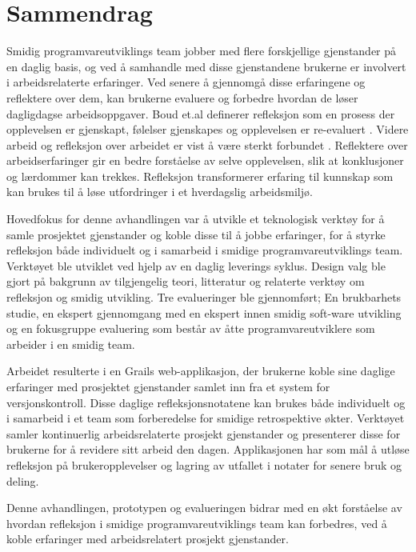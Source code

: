 \newpage
\section*{Sammendrag}
Smidig programvareutviklings team jobber med flere forskjellige gjenstander på en daglig basis, og ved å samhandle med disse gjenstandene brukerne er involvert i arbeidsrelaterte erfaringer. Ved senere å gjennomgå disse erfaringene og reflektere over dem, kan brukerne evaluere og forbedre hvordan de løser dagligdagse arbeidsoppgaver. Boud et.al definerer refleksjon som en prosess der opplevelsen er gjenskapt, følelser gjenskapes og opplevelsen er re-evaluert \citep{boudreflection1985}. 
Videre arbeid og refleksjon over arbeidet er vist å være sterkt forbundet \citep{Schon1983, Chaiklin1993}. Reflektere over arbeidserfaringer gir en bedre forståelse av selve opplevelsen, slik at konklusjoner og lærdommer kan trekkes. Refleksjon transformerer erfaring til kunnskap som kan brukes til å løse utfordringer i et hverdagslig arbeidsmiljø.

Hovedfokus for denne avhandlingen var å utvikle et teknologisk verktøy for å samle prosjektet gjenstander og koble disse til å jobbe erfaringer, for å styrke refleksjon både individuelt og i samarbeid i smidige programvareutviklings team. Verktøyet ble utviklet ved hjelp av en daglig leverings syklus. Design valg ble gjort på bakgrunn av tilgjengelig teori, litteratur og relaterte verktøy om refleksjon og smidig utvikling. Tre evalueringer ble gjennomført; En brukbarhets studie, en ekspert gjennomgang med en ekspert innen smidig soft-ware utvikling og en fokusgruppe evaluering som består av åtte programvareutviklere som arbeider i en smidig team.

Arbeidet resulterte i en Grails web-applikasjon, der brukerne koble sine daglige erfaringer med prosjektet gjenstander samlet inn fra et system for versjonskontroll. Disse daglige refleksjonsnotatene kan brukes både individuelt og i samarbeid i et team som forberedelse for smidige retrospektive økter. Verktøyet samler kontinuerlig arbeidsrelaterte prosjekt gjenstander og presenterer disse for brukerne for å revidere sitt arbeid den dagen. Applikasjonen har som mål å utløse refleksjon på brukeropplevelser og lagring av utfallet i notater for senere bruk og deling.

Denne avhandlingen, prototypen og evalueringen bidrar med en økt forståelse av hvordan refleksjon i smidige programvareutviklings team kan forbedres, ved å koble erfaringer med arbeidsrelatert prosjekt gjenstander.

\newpage